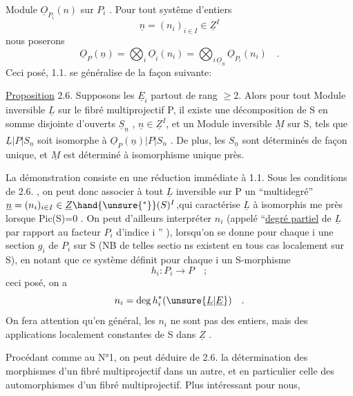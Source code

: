 
Module  $\underline{O}_{P_i}(n)$ sur $P_i$ . Pour tout systême d'entiers
\[ \underline{n} = (n_i)_{i \in I} \in \underline{Z}^I \]
nous  poserons
\[ \underline{O}_P(\underline{n}) = \bigotimes_i \underline{O}_i(n_i) = \bigotimes_{i\,\underline{O}_S} \underline{O}_{P_i}(n_i) \quad . \]
Ceci posé, 1.1. se généralise de la façon suivante:

\uline{Proposition} 2.6. Supposons les $\underline{E}_i$ partout de rang $\geq$2. Alors pour tout
Module inversible $\underline{L}$ sur le fibré multiprojectif P, il existe une
 décomposition de S en somme disjointe d'ouverts $\underline{S}_{\underline{n}}$ , $\underline{n} \in \underline{Z}^I$,
et  un Module inversible $\underline{M}$ sur S, tels que $\underline{L}|P|S_{\underline{n}}$
soit isomorphe à $\underline{O}_P(\underline{n})|P|S_n$ . De plus, les $S_{\underline{n}}$ sont déterminés de façon
unique, et  $\underline{M}$ est déterminé à isomorphisme unique près.

 La démonstration  consiste en une réduction immédiate à 1.1.
Sous les conditions de 2.6. , on peut donc associer à tout $\underline{L}$ inversible
sur P un ``multidegré'' $\underline{n} = (n_i)_{i \in I} \in \underline{Z}\hand{\unsure{^{*}}}(S)^I$,qui caractérise $\underline{L}$ à isomorphis
me près lorsque Pic(S)=0 . On peut d'ailleurs interpréter $n_i$ (appelé
``\uline{degré partiel} de $\underline{L}$ par rapport au facteur $P_i$ d'indice i '' ), lorsqu'on
se donne pour chaque i une section $g_i$ de $P_i$ sur S (NB de telles sectio
ns existent en tous cas localement sur S), en notant que ce système définit
pour chaque i un S-morphisme 
\[ h_i : P_i \longrightarrow P \quad ; \]
ceci posé, on a
\[ n_i = \deg h_i^{*}(\unsure{\underline{L}|\underline{E}}) \quad . \]
On fera attention qu'en général, les $n_i$ ne sont pas des entiers, mais des
applications localement constantes de S dans $\underline{Z}$ .

Procédant comme au N°1, on peut déduire de 2.6. la détermination des
morphismes d'un fibré multiprojectif dans un autre, et en particulier celle
des automorphismes d'un fibré multiprojectif. Plus intéressant pour nous,

